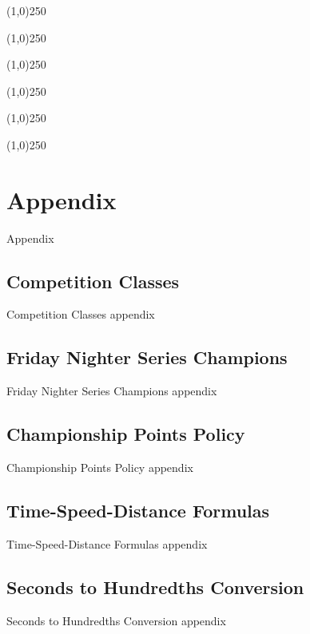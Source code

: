 \documentclass[letterpaper,11pt]{article}
\begin{document}
\cleardoublepage


\tableofcontents

\cleardoublepage

\pagestyle{plain}


\begin{center}
\line(1,0){250}
\end{center}


\begin{center}
\line(1,0){250}
\end{center}


\begin{center}
\line(1,0){250}
\end{center}


\begin{center}
\line(1,0){250}
\end{center}


\begin{center}
\line(1,0){250}
\end{center}


\begin{center}
\line(1,0){250}
\end{center}



\section{Appendix}

Appendix

\subsection{Competition Classes}

Competition Classes appendix

\subsection{Friday Nighter Series Champions}

Friday Nighter Series Champions appendix

\subsection{Championship Points Policy}

Championship Points Policy appendix

\subsection{Time-Speed-Distance Formulas}

Time-Speed-Distance Formulas appendix

\subsection{Seconds to Hundredths Conversion}

Seconds to Hundredths Conversion appendix

\clearpage

\hbox{}\clearpage\hbox{}\cleardoublepage
\end{document}
